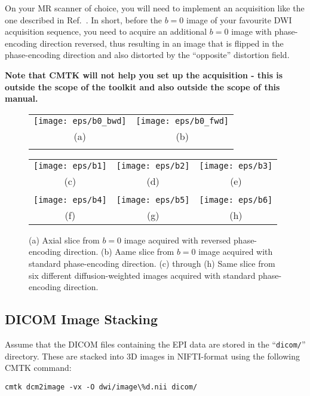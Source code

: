 \documentclass{InsightArticle}
\begin{document}
On your MR scanner of choice, you will need to implement an acquisition like
the one described in Ref.~\cite{HollKupeDale:2010}. In short, before the $b=0$
image of your favourite DWI acquisition sequence, you need to acquire an
additional $b=0$ image with phase-encoding direction reversed, thus resulting
in an image that is flipped in the phase-encoding direction and also distorted
by the ``opposite'' distortion field. 

{\bf Note that CMTK will not help you set up the acquisition - this is outside
the scope of the toolkit and also outside the scope of this manual.}

\begin{figure}[tbp]
\begin{center}
\begin{tabular}{cc}
\texttt{[image: eps/b0\_bwd]} &
\texttt{[image: eps/b0\_fwd]} \\
(a) & (b) \\
\\
\end{tabular}
\begin{tabular}{ccc}
\texttt{[image: eps/b1]} &
\texttt{[image: eps/b2]} &
\texttt{[image: eps/b3]} \\
(c) & (d) & (e) \\
\\
\texttt{[image: eps/b4]} &
\texttt{[image: eps/b5]} &
\texttt{[image: eps/b6]} \\
(f) & (g) & (h) \\
\end{tabular}
\end{center}
\caption{(a) Axial slice from $b=0$ image acquired with reversed phase-encoding
  direction. (b) Aame slice from $b=0$ image acquired with standard
  phase-encoding direction. (c) through (h) Same slice from six different
  diffusion-weighted images acquired with standard phase-encoding direction.}
\label{fig:B0FwBw}
\end{figure}

\subsection{DICOM Image Stacking}

Assume that the DICOM files containing the EPI data are stored in the
``\texttt{dicom/}'' directory. These are stacked into 3D images in
NIFTI-format using the following CMTK command:
\begin{verbatim}
cmtk dcm2image -vx -O dwi/image\%d.nii dicom/
\end{verbatim}
\end{document}
